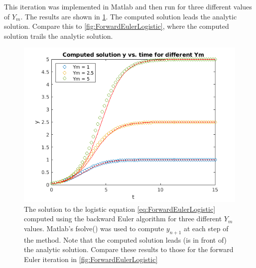 \documentclass[hidelinks,notitlepage]{book}
\begin{document}
This iteration was implemented in Matlab and then run for three different values of $Y_m$. The results are shown in \cref{fig:BackwardEulerLogistic}.  The computed solution leads the analytic solution.  Compare this to \cref{fig:ForwardEulerLogistic}, where the computed solution trails the analytic solution.
\begin{figure}[tbh]
	\centering
	\includegraphics[width=0.7\columnwidth]{BackwardEulerLogistic.png}
	\caption{The solution to the logistic equation \cref{eq:ForwardEulerLogistic} computed using the backward Euler algorithm for three different $Y_m$ values.  Matlab's fsolve() was used to compute $y_{n+1}$ at each step of the method.  Note that the computed solution leads (is in front of) the analytic solution.  Compare these results to those for the forward Euler iteration in \cref{fig:ForwardEulerLogistic}}
	\label{fig:BackwardEulerLogistic}
\end{figure}
\end{document}

